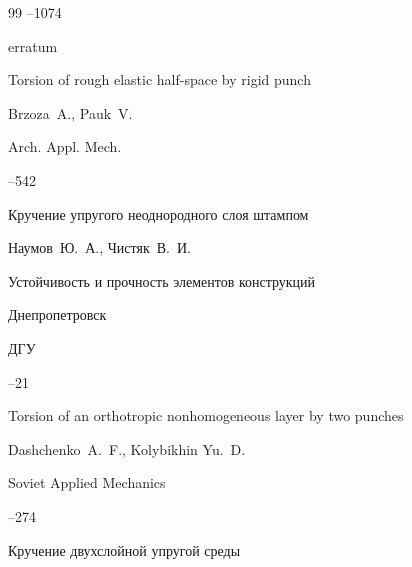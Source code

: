 \begin{thebibliography}{99}
--1074



\moreref

\paperinfo erratum






\paper Torsion of rough elastic half-space by rigid punch

\by Brzoza~A., Pauk~V. 

\jour Arch. Appl. Mech. 




--542






\paper Кручение упругого неоднородного слоя штампом 

\by Наумов~Ю.~А., Чистяк~В.~И. 

\inbook Устойчивость и прочность элементов конструкций 

\publaddr Днепропетровск 

\publ ДГУ


--21




\paper Torsion of an orthotropic nonhomogeneous layer by two punches 

\by Dashchenko~A.~F., Kolybikhin Yu.~D. 

\jour Soviet Applied Mechanics 




--274






\paper Кручение двухслойной упругой среды


\end{thebibliography}
